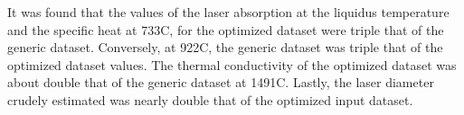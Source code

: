 It was found that the values of the laser absorption at the liquidus temperature and the specific heat at 733\degree C, for the optimized dataset were triple that of the generic dataset.  Conversely, at 922\degree C, the generic dataset was triple that of the optimized dataset values.  The thermal conductivity of the optimized dataset was about double that of the generic dataset at 1491\degree C.  Lastly, the laser diameter crudely estimated was nearly double that of the optimized input dataset.